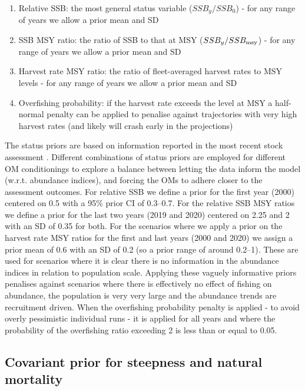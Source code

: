 \documentclass[12pt,a4paper,twoside,times,sky,standard]{csiroreport2017}
\begin{document}
\begin{enumerate}
    \item Relative SSB: the most general status variable ($SSB_y/SSB_0$) - for any range of years we allow a prior mean and SD
    \item SSB MSY ratio: the ratio of SSB to that at MSY ($SSB_y/SSB_{\rm msy}$) - for any range of years we allow a prior mean and SD
    \item Harvest rate MSY ratio: the ratio of fleet-averaged harvest rates to MSY levels - for any range of years we allow a prior mean and SD
    \item Overfishing probability: if the harvest rate exceeds the level at MSY a half-normal penalty can be applied to penalise against trajectories with very high harvest rates (and likely will crash early in the projections)
\end{enumerate}

The status priors are based on information reported in the most recent stock assessment \cite{albsa}. Different combinations of status priors are employed for different OM conditionings to explore a balance between letting the data inform the model (w.r.t. abundance indices), and forcing the OMs to adhere closer to the assessment outcomes. For relative SSB we define a prior for the first year (2000) centered on 0.5 with a 95\% prior CI of 0.3--0.7. For the relative SSB MSY ratios we define a prior for the last two years (2019 and 2020) centered on 2.25 and 2 with an SD of 0.35 for both. For the scenarios where we apply a prior on the harvest rate MSY ratios for the first and last years (2000 and 2020) we assign a prior mean of 0.6 with an SD of 0.2 (so a prior range of around 0.2--1). These are used for scenarios where it is clear there is no information in the abundance indices in relation to population scale. Applying these vaguely informative priors penalises against scenarios where there is effectively no effect of fishing on abundance, the population is very very large and the abundance trends are recruitment driven. When the overfishing probability penalty is applied - to avoid overly pessimistic individual runs - it is applied for all years and where the probability of the overfishing ratio exceeding 2 is less than or equal to 0.05.

\subsection{Covariant prior for steepness and natural mortality}
\end{document}
